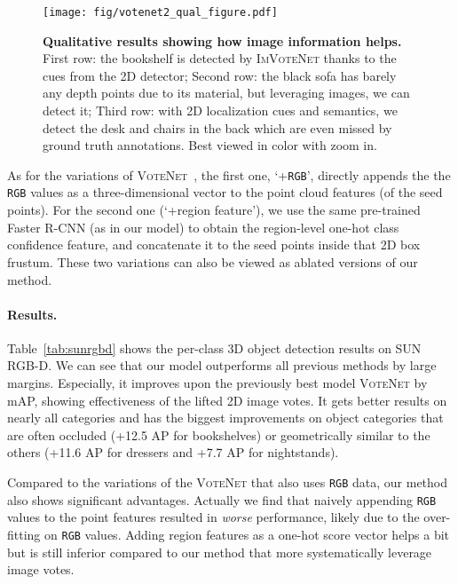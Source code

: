 \documentclass[10pt,twocolumn,letterpaper]{article}
\newcommand{\votenet}{\textsc{VoteNet}\xspace}
\newcommand{\imvotenet}{\textsc{ImVoteNet}\xspace}
\newcommand{\rgb}{\texttt{RGB}\xspace}
\begin{document}
\begin{figure*}[t!]
    \centering
    \texttt{[image: fig/votenet2\_qual\_figure.pdf]}
    \caption{\textbf{Qualitative results showing how image information helps.} First row: the bookshelf is detected by \imvotenet thanks to the cues from the 2D detector; Second row: the black sofa has barely any depth points due to its material, but leveraging images, we can detect it; Third row: with 2D localization cues and semantics, we detect the desk and chairs in the back which are even missed by ground truth annotations. Best viewed in color with zoom in.}
    \label{fig:qualitative}
\end{figure*}

As for the variations of \votenet~\cite{voteNet}, the first one, `+\rgb', directly appends the the \rgb values as a three-dimensional vector to the point cloud features (of the seed points). For the second one (`+region feature'), we use the same pre-trained Faster R-CNN (as in our model) to obtain the region-level one-hot class confidence feature, and concatenate it to the seed points inside that 2D box frustum. These two variations can also be viewed as ablated versions of our method. 

\paragraph{Results.}
Table~\ref{tab:sunrgbd} shows the per-class 3D object detection results on SUN RGB-D. We can see that our model outperforms all previous methods by large margins. Especially, it improves upon the previously best model \votenet by  mAP, showing effectiveness of the lifted 2D image votes. It gets better results on nearly all categories and has the biggest improvements on object categories that are often occluded (+12.5 AP for bookshelves) or geometrically similar to the others (+11.6 AP for dressers and +7.7 AP for nightstands).

Compared to the variations of the \votenet that also uses \rgb data, our method also shows significant advantages. Actually we find that naively appending \rgb values to the point features resulted in \emph{worse} performance, likely due to the over-fitting on \rgb values. Adding region features as a one-hot score vector helps a bit but is still inferior compared to our method that more systematically leverage image votes.
\end{document}
